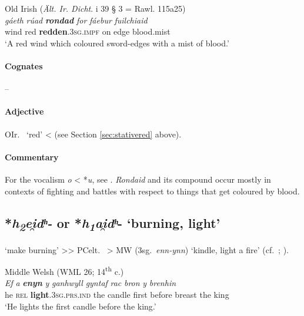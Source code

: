 \documentclass[output=paper,colorlinks,citecolor=brown]{langscibook}
\begin{document}
\begin{exe}
    \ex Old Irish (\textit{Ält. Ir. Dicht}. i 39 § 3 = Rawl. 115a25) \label{ex:NIPred}\\
        \gll \textit{gáeth} \textit{rúad} {\textit{\textbf{rondad}} } \textit{for} \textit{fáebur} \textit{fuilchiaid} \\
        wind red \textbf{redden}.\textsc{3sg.impf} on edge blood.mist \\
        \glt ‘A red wind which coloured sword-edges with a mist of blood.’\\
\end{exe}
 
\paragraph*{Cognates}  -- 

\paragraph*{Adjective} 

OIr.\  ‘red’ <  (see Section \ref{sec:stativered} above).

\paragraph*{Commentary}  

For the vocalism \textit{o} < *\textit{u}, see \citet[87]{Stueber1998}. \textit{Rondaid}  and its compound  occur mostly in contexts of fighting and battles with respect to things that get coloured by blood.

\subsection{*\textit{h\textsubscript{2}ei̯dʰ-} {or} {*\textit{h\textsubscript{1}ai̯dʰ}-} {‘burning, light’} }
\label{sec:NIPburning}

 ‘make burning’ >{>} PCelt.\  > MW  (3sg.\ \textit{enn-ynn}) ‘kindle, light a fire’ (cf.\ \citealt[374--375]{Schumacher2004}; ).

\begin{exe}
    \ex Middle Welsh (WML 26; 14\textsuperscript{th} c.)\label{ex:NIPburning}\\
        \gll \textit{Ef} \textit{a} {\textit{\textbf{enyn}} } \textit{y} \textit{ganhwyll} \textit{gyntaf} \textit{rac} \textit{bron} \textit{y} \textit{brenhin}  \\
        he \textsc{rel} \textbf{light}.\textsc{3sg.prs.ind} the candle first before breast the king \\
        \glt ‘He lights the first candle before the king.’\\
\end{exe}
 
\end{document}
